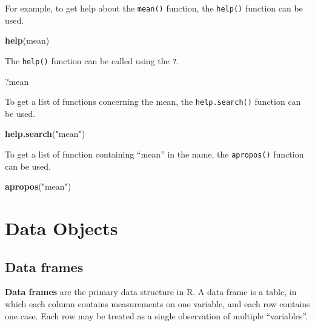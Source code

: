 \documentclass[]{book}
\newenvironment{Shaded}{\begin{snugshade}}{\end{snugshade}}
\newcommand{\KeywordTok}[1]{\textcolor[rgb]{0.13,0.29,0.53}{\textbf{{#1}}}}
\newcommand{\StringTok}[1]{\textcolor[rgb]{0.31,0.60,0.02}{{#1}}}
\newcommand{\NormalTok}[1]{{#1}}
\begin{document}
For example, to get help about the \texttt{mean()} function, the
\texttt{help()} function can be used.

\begin{Shaded}
\begin{Highlighting}[]
\KeywordTok{help}\NormalTok{(mean)}
\end{Highlighting}
\end{Shaded}

The \texttt{help()} function can be called using the \texttt{?}.

\begin{Shaded}
\begin{Highlighting}[]
\NormalTok{?mean}
\end{Highlighting}
\end{Shaded}

To get a list of functions concerning the mean, the
\texttt{help.search()} function can be used.

\begin{Shaded}
\begin{Highlighting}[]
\KeywordTok{help.search}\NormalTok{(}\StringTok{"mean"}\NormalTok{)}
\end{Highlighting}
\end{Shaded}

To get a list of function containing ``mean'' in the name, the
\texttt{apropos()} function can be used.

\begin{Shaded}
\begin{Highlighting}[]
\KeywordTok{apropos}\NormalTok{(}\StringTok{"mean"}\NormalTok{)}
\end{Highlighting}
\end{Shaded}

\chapter{Data Objects}\label{data-objects}

\section{Data frames}\label{data-frames}

\textbf{Data frames} are the primary data structure in R. A data frame
is a table, in which each column contains measurements on one variable,
and each row contains one case. Each row may be treated as a single
observation of multiple ``variables''.
\end{document}

